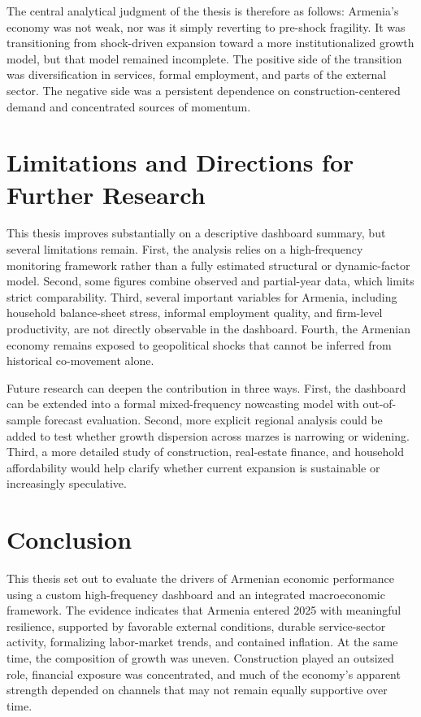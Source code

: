\documentclass[12pt,a4paper]{report}
\begin{document}
The central analytical judgment of the thesis is therefore as follows: Armenia's economy was not weak, nor was it simply reverting to pre-shock fragility. It was transitioning from shock-driven expansion toward a more institutionalized growth model, but that model remained incomplete. The positive side of the transition was diversification in services, formal employment, and parts of the external sector. The negative side was a persistent dependence on construction-centered demand and concentrated sources of momentum.

\chapter{Limitations and Directions for Further Research}
This thesis improves substantially on a descriptive dashboard summary, but several limitations remain. First, the analysis relies on a high-frequency monitoring framework rather than a fully estimated structural or dynamic-factor model. Second, some figures combine observed and partial-year data, which limits strict comparability. Third, several important variables for Armenia, including household balance-sheet stress, informal employment quality, and firm-level productivity, are not directly observable in the dashboard. Fourth, the Armenian economy remains exposed to geopolitical shocks that cannot be inferred from historical co-movement alone.

Future research can deepen the contribution in three ways. First, the dashboard can be extended into a formal mixed-frequency nowcasting model with out-of-sample forecast evaluation. Second, more explicit regional analysis could be added to test whether growth dispersion across marzes is narrowing or widening. Third, a more detailed study of construction, real-estate finance, and household affordability would help clarify whether current expansion is sustainable or increasingly speculative.

\chapter{Conclusion}
This thesis set out to evaluate the drivers of Armenian economic performance using a custom high-frequency dashboard and an integrated macroeconomic framework. The evidence indicates that Armenia entered 2025 with meaningful resilience, supported by favorable external conditions, durable service-sector activity, formalizing labor-market trends, and contained inflation. At the same time, the composition of growth was uneven. Construction played an outsized role, financial exposure was concentrated, and much of the economy's apparent strength depended on channels that may not remain equally supportive over time.\cite{imfCR24348,wbPulse2025,cbaImpl2025}
\end{document}
